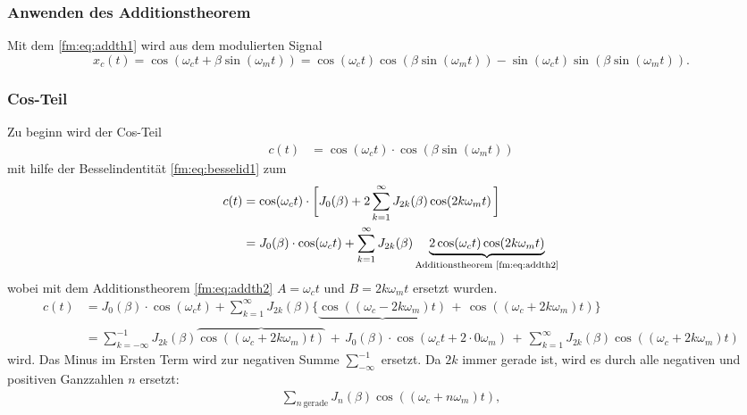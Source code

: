 \subsubsection{Anwenden des Additionstheorem}
Mit dem \eqref{fm:eq:addth1} wird aus dem modulierten Signal
\[
    x_c(t) 
    =
    \cos(\omega_c t + \beta\sin(\omega_mt))
    =
    \cos(\omega_c t)\cos(\beta\sin(\omega_m t))-\sin(\omega_ct)\sin(\beta\sin(\omega_m t)).
    \label{fm:eq:start}
\]
\subsubsection{Cos-Teil}
Zu beginn wird der Cos-Teil
\begin{align*}
    c(t) 
    &=
    \cos(\omega_c t)\cdot\cos(\beta\sin(\omega_mt))  
\end{align*}
mit hilfe der Besselindentität \eqref{fm:eq:besselid1} zum
\begin{align*}
    c(t)
    &=
    \cos(\omega_c t) \cdot \bigg[ J_0(\beta) + 2\sum_{k=1}^\infty J_{2k}(\beta) \cos( 2k \omega_m t)\, \bigg]
    \\
    &=
    J_0(\beta) \cdot \cos(\omega_c t) + \sum_{k=1}^\infty J_{2k}(\beta) \underbrace{2\cos(\omega_c t)\cos(2k\omega_m t)}_{\text{Additionstheorem \eqref{fm:eq:addth2}}}
\end{align*}
wobei mit dem Additionstheorem \eqref{fm:eq:addth2} \(A = \omega_c t\) und \(B = 2k\omega_m t \) ersetzt wurden.
\begin{align*}
    c(t)
    &=
    J_0(\beta) \cdot \cos(\omega_c t) + \sum_{k=1}^\infty J_{2k}(\beta) \{ \underbrace{\cos((\omega_c - 2k \omega_m) t)} \,+\, \cos((\omega_c + 2k \omega_m) t) \}
    \\
    &=
    \sum_{k=-\infty}^{-1} J_{2k}(\beta)  \overbrace{\cos((\omega_c +2k \omega_m) t)} 
    \,+\,J_0(\beta)\cdot \cos(\omega_c t+ 2\cdot0 \omega_m) 
    \,+\, \sum_{k=1}^\infty J_{2k}(\beta)\cos((\omega_c + 2k \omega_m) t) 
\end{align*}
wird.
Das Minus im Ersten Term wird  zur negativen Summe \(\sum_{-\infty}^{-1}\) ersetzt.
Da \(2k\) immer gerade ist, wird es durch alle negativen und positiven Ganzzahlen \(n\) ersetzt:
\begin{align*}
    \sum_{n\, \text{gerade}} J_{n}(\beta) \cos((\omega_c + n \omega_m) t),
    \label{fm:eq:gerade}
\end{align*}
